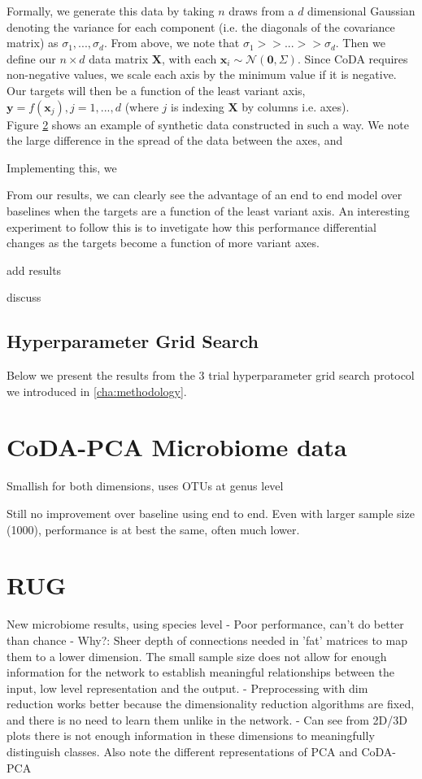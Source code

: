 Formally, we generate this data by taking $n$ draws from a $d$ dimensional Gaussian denoting the variance for each component (i.e. the diagonals of the covariance matrix) as $\sigma_1, ..., \sigma_d$. From above, we note that $\sigma_1 >>  ... >> \sigma_d$. Then we define our $n\times d$ data matrix $\mathbf{X}$, with each $\mathbf{x}_i \sim \mathcal{N}(\mathbf{0}, \Sigma)$. Since CoDA requires non-negative values, we scale each axis by the minimum value if it is negative. Our targets will then be a function of the least variant axis, $\mathbf{y} = f(\mathbf{x}_j), j = 1,...,d$ (where $j$ is indexing $\mathbf{X}$ by columns i.e. axes).  \\

Figure \ref{} shows an example of synthetic data constructed in such a way. We note the large difference in the spread of the data between the axes, and 


Implementing this, we 

From our results, we can clearly see the advantage of an end to end model over baselines when the targets are a function of the least variant axis. An interesting experiment to follow this is to invetigate how this performance differential changes as the targets become a function of more variant axes. 

add results 

discuss

\subsection{Hyperparameter Grid Search}
Below we present the results from the 3 trial hyperparameter grid search protocol we introduced in \ref{cha:methodology}.  





\section{CoDA-PCA Microbiome data}
Smallish for both dimensions, uses OTUs at genus level

Still no improvement over baseline using end to end. Even with larger sample size (1000), performance is at best the same, often much lower.  

\section{RUG}
New microbiome results, using species level  
- Poor performance, can't do better than chance
- Why?: Sheer depth of connections needed in 'fat' matrices to map them to a lower dimension. The small sample size does not allow for enough information for the network to establish meaningful relationships between the input, low level representation and the output. 
- Preprocessing with dim reduction works better because the dimensionality reduction algorithms are fixed, and there is no need to learn them unlike in the network.
- Can see from 2D/3D plots there is not enough information in these dimensions to meaningfully distinguish classes. Also note the different representations of PCA and CoDA-PCA

